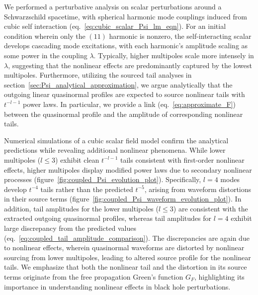 \documentclass[reprint,aps,physrev,superscriptaddress,10pt,notitlepage,prd,nofootinbib,onecolumn]{revtex4-2}
\newcommand{\fref}[1]{figure~\ref{#1}}
\newcommand{\sref}[1]{section~\ref{#1}}
\begin{document}
We performed a perturbative analysis on scalar perturbations around a Schwarzschild spacetime, with spherical harmonic mode couplings induced from cubic self interaction (eq.~\eqref{eq:cubic_scalar_Psi_lm_eqn}).
For an initial condition wherein only the $(11)$ harmonic is nonzero, the self-interacting scalar develops cascading mode excitations, with each harmonic's amplitude scaling as some power in the coupling $\lambda$.
Typically, higher multipoles scale more intensely in $\lambda$, suggesting that the nonlinear effects are predominantly captured by the lowest multipoles.
Furthermore, utilizing the sourced tail analyses in \sref{sec:Psi_analytical_approximation}, we argue analytically that the outgoing linear quasinormal profiles are expected to source nonlinear tails with $t^{-l-1}$ power laws.
In particular, we provide a link (eq.~\eqref{eq:approximate_F}) between the quasinormal profile and the amplitude of corresponding nonlinear tails.



Numerical simulations of a cubic scalar field model confirm the analytical predictions while revealing additional nonlinear phenomena.
While lower multipoles ($l \leq 3$) exhibit clean $t^{-l-1}$ tails consistent with first-order nonlinear effects, higher multipoles display modified power laws due to secondary nonlinear processes (\fref{fig:coupled_Psi_evolution_plot}).
Specifically, $l=4$ modes develop $t^{-4}$ tails rather than the predicted $t^{-5}$, arising from waveform distortions in their source terms (\fref{fig:coupled_Psi_waveform_evolution_plot}).
In addition, tail amplitudes for the lower multipoles ($l \leq 3$) are consistent with the extracted outgoing quasinormal profiles, whereas tail amplitudes for $l=4$ exhibit large discrepancy from the predicted values (eq.~\eqref{eq:coupled_tail_amplitude_comparison}).
The discrepancies are again due to nonlinear effects, wherein quasinormal waveforms are distorted by nonlinear sourcing from lower multipoles, leading to altered source profile for the nonlinear tails.
We emphasize that both the nonlinear tail and the distortion in its source terms originate from the free propagation Green's function $G_F$, highlighting its importance in understanding nonlinear effects in black hole perturbations.
\end{document}
